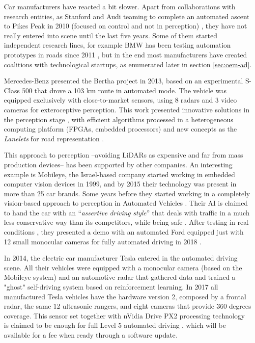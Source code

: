 Car manufacturers have reacted a bit slower. 
Apart from collaborations with research entities, as Stanford and Audi teaming
to complete an automated ascent to Pikes Peak in 2010 (focused on control and
not in perception) \cite{Funke2012}, they have not really entered into scene
until the last five years. 
Some of them started independent research lines, for example
BMW has been testing automation prototypes in roads since 2011 
\cite{Aeberhard2015a}, but in the end most manufacturers have created
coalitions with technological startups, as enumerated later in section
\ref{sec:oem-ad}.

Mercedes-Benz presented the Bertha project in 2013, based on an experimental 
S-Class 500 that drove a 103 km route in automated mode. The vehicle was 
equipped exclusively with close-to-market sensors, using 8 radars and 3 
video cameras for exteroceptive perception.
This work presented innovative solutions in the perception stage 
\cite{Bender2014}, with efficient algorithms processed in a heterogeneous 
computing platform (FPGAs, embedded processors) and new concepts as the 
\emph{Lanelets} for road representation \cite{Ziegler2014}. 

This approach to perception --avoiding LiDARs as expensive and far from mass 
production devices-- has been supported by other companies. An interesting 
example is Mobileye, the Israel-based company started working in embedded 
computer vision devices in 1999, and by 2015 their technology was present in 
more than 25 car brands. Some years before they started working in a completely 
vision-based approach to perception in Automated Vehicles \cite{Mobileye2018}. 
Their AI is claimed to hand the car with an ``\emph{assertive driving style}'' 
that deals with traffic in a much less conservative way than its competitors,
while being safe \cite{Shalev-shwartz2016, Shalev-Shwartz2017}. 
After testing in real conditions \cite{Edelstein2018}, they presented a demo with an automated Ford equipped just with 12 small monocular cameras for fully automated driving in 2018 \cite{Scheer2018}.

In 2014, the electric car manufacturer Tesla entered in the automated driving 
scene. All their vehicles were equipped with a monocular camera (based on the 
Mobileye system) and an automotive radar that gathered data and trained a 
"ghost" self-driving system based on reinforcement learning. In 2017 all 
manufactured Tesla vehicles have the hardware version 2, composed by a frontal 
radar, the same 12 ultrasonic rangers, and eight cameras that provide 360 
degrees coverage. This sensor set together with nVidia Drive PX2 processing 
technology is claimed to be enough for full Level 5 automated driving
\cite{Hawkins2017}, which will be available for a fee when ready through a
software update.

